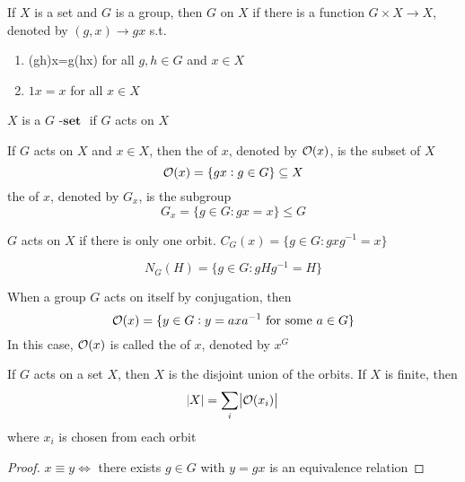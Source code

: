 \documentclass[11pt]{article}
\begin{document}
\begin{definition}[]
If \(X\) is a set and \(G\) is a group, then \(G\)  on \(X\) if there is a
function \(G\times X\to X\), denoted by \((g,x)\to gx\) s.t.
\begin{enumerate}
\item (gh)x=g(hx) for all \(g,h\in G\) and \(x\in X\)
\item \(1x=x\) for all \(x\in X\)
\end{enumerate}


\(X\) is a \(G\textbf{ -set }\) if \(G\) acts on \(X\)
\end{definition}

\begin{definition}[]
If \(G\) acts on \(X\) and \(x\in X\), then the  of \(x\), denoted by
\(\mathcal{O}(x)\), is the subset of \(X\)
\begin{equation*}
\mathcal{O}(x)=\{gx:g\in G\}\subseteq X
\end{equation*}
the  of \(x\), denoted by \(G_x\), is the subgroup
\begin{equation*}
G_x=\{g\in G:gx=x\}\le G
\end{equation*}
\end{definition}

\(G\) acts  on \(X\) if there is only one orbit.
 \(C_G(x)=\{g\in G:gxg^{-1}=x\}\)

\begin{equation*}
N_G(H)=\{g\in G:gHg^{-1}=H\}
\end{equation*}

When a group \(G\) acts on itself by conjugation, then
\begin{equation*}
\mathcal{O}(x)=\{y\in G:y=axa^{-1} \text{ for some } a\in G\}
\end{equation*}
In this case, \(\mathcal{O}(x)\) is called the  of \(x\), denoted
by \(x^G\)

\begin{proposition}[]
If \(G\) acts on a set \(X\), then \(X\) is the disjoint union of the orbits. If
\(X\) is finite, then
\begin{equation*}
\abs{X}=\displaystyle\sum_i\abs{\mathcal{O}(x_i)}
\end{equation*}
where \(x_i\) is chosen from each orbit
\end{proposition}

\begin{proof}
\(x\equiv y\Leftrightarrow\) there exists \(g\in G\) with \(y=gx\) is an
equivalence relation
\end{proof}
\end{document}
